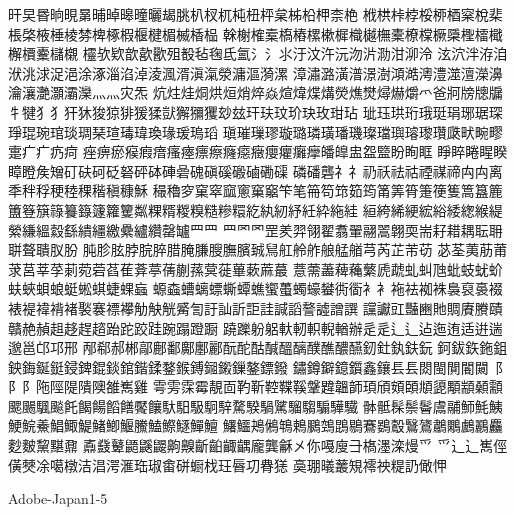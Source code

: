 旰旲昬晌晛晜晡晫暤曈曬朅朓朳杈杌杶杻枰枲柹柗柙柰栬
栰栱桛桲桵桺梄梥梲棐棖棨棭棰棱棼椑椓椵椻楗楣楲楿榀
榦榭榷槖槗樁樏樕樨樴樾橅橐橑橖橛檃檉檑檝檞檟櫜櫧櫬
欞欤欵歆歖歠殂殾毡毱氐氳氵⺡⺢汙汶汻沅沕沜泐泔泖泠
泫泬泮洊洎洑洮浗浞浥涂涿淄淊淖淩渢湑滇滊滎滽漚漪漯
漳潚潞潢潽澋澍澒澔澚澧澨澶濚濞瀹瀼灔灝灞灤⺣灬灾炁
炕炷烓烔烘烜焇焠焱煊煒煠煹熒燋燓燖爀爝爫爸牁牓牕牖
牜犍⺨犭犴狇狻猄猅猨猱獃獬獼玃玅玆玕玞玟玠玦玫玵玷
玼珏珙珩珴珽琄琊琚琛琤琨琬琯琰琱琹瑄瑇瑋瑍瑑瑗瑦瑫
瑱璀璅璆璇璐璘璜璠璣璨璫璵璿瓈瓚瓞畎畹疁疐⽧疒疓疴
痤痹瘀瘊瘕瘖瘙瘞瘭瘵癃癋癥癭癯癱癴皤皥盅盌盬盼眴眶
睜睟睠睲睽瞕瞪矦矰矴砆砢砭砮砰砵硨碞磈磌磎磤磠磡磲
磷磻礱⺭礻礽祅祛祜禋禖禘⽱禸离秊秚稃稉稑稞稭稹穅穌
穝穭穸窠窣窳窻窼竆笇笔笧笱筇筎筠筩筭筲箑箯篗篙簋簏
簠簦簱簶籑籙籧籮籰粼粿糈糉糗糙糝糫紇紈紉紓紝紣絁絓
絙絝絺綆綋綌緌緫緱緹縈縑縕縠繇繢繮繳纍纑纘罄罏⺫⺲
罒⺱罓罡羑羿翎翟翥翬翮翯翺耎耑耔耤耦耺耼聠聱聵肞肦
肫胗胘脖脘脺腊腌膁膄膴臏臹舃舡舲舴艆艋艏芎芮芷芾苆
苾荃荑荕莆莍莒莘莩莿菀菪萏萑葊葶蒨蒯蓀蓂蓰蓽蔌蔴蕞
薏薷藎薭蘒蘩虒虣虬虯虺蚍蚑蚘蚧蚨蛺蛽蜋蜓蜙蜞蜨蜾蝱
螈螙螬螭螵蟖蟫蟭蠁蠆蠋蠔蠜衖衟⻂衤袘袪袽袾裊裒裛裰
裱褆褘褙褚褧褰褾襻觔觖觥觱訇訏訕訢詎詿諴謟謷譃譄譔
讜讞豇豔豳貤賙賡賸賾贛赩赬趄趍趕趦跆跎跤跬踠蹋蹬蹰
蹺躒躮躳軑軔軹輗輶辦⾡辵⻍辶迠迤迶适逬遄邈邕邙邛邢
邴郗郝郴鄗鄜鄱鄺鄽酈酛酡酤醎醞醨醭醮醲醼釰釷釻鈇鈨
鈳鈸鉃鉇鉏鉠鋂鋋鋌鋟錍錕錟錧鍇鍒鍪鍭鎛鎺鎩鏁鏊鏢鏺
鏽鐏鐴鐿鑕鑫鑲⻒镸閦閩閴閽闚⻏⻖阝陁陘隄隤隩雒嶲雞
雩雱霂霉靚靣靮靳鞚鞢鞵鞶韙韞韴頊頎頞頣頫頾顒顓顙顬
颸颺颿飈飥餲餳饀饍饜饟馱馹馺駉騂騖騤騧騭騮騶騸驊驖
骵骶髹鬃鬠鬳鬴魳魹鮧鯁鯇鯗鯧鯫鯷鯺鯽鰋鰧鰪鰶鱁鱓鱣
鱰鱷鴂鵂鵇鵣鵩鵼鵾鶍鶱鷃鷇鷖鷟鷫鷴鸕鸝麤麨麬黧黮鼐
鼒鼗鼙鼯鼷鼹齁齅齗齨齱齵龐龔龢㐅你嘠廋⺕𣘺濹滦熳⺤
爫⻌辶嶲俓僙僰凃噶橔洁淐湂滙珤琡畬硑蟵𣏾玨㫳㓛䐌㺊
䯨㻚㬢䕺䂓䙥䄃䊓䚮㒈𢘉

Adobe-Japan1-5

